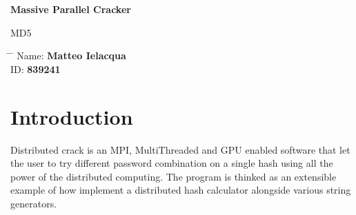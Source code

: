 \documentclass[12pt,a4paper]{article}
\title{}
\author{}
\date{}
\begin{document}
\newcommand{\subf}[2]{%
    {\small\begin{tabular}[t]{@{}c@{}}
                #1 \\#2
            \end{tabular}}%
}

\begin{titlepage}
    \begin{center}
        \vspace*{3cm}

        \Huge
        \textbf{Massive Parallel Cracker}

        \vspace{0.3cm}
        \Huge
        MD5

        \vspace{0.8cm}
        \large



        \vspace{0.5cm}
        \LARGE


        \vspace{1.5cm}

        \textbf{}

        \vfill



        \vspace{0.8cm}



        \Large




    \end{center}
    \Large
    \begin{tabbing}
        \hspace*{1em}\= \hspace*{8em} \= \kill %
        \> Name:\>  \textbf{Matteo Ielacqua} \\
        \> ID:\>  \textbf{839241} \\
    \end{tabbing}

\end{titlepage}


\section{Introduction}
Distributed crack is an MPI, MultiThreaded and GPU enabled software that let the user to try different password combination on a single hash using all the power of the distributed computing. The program is thinked as an extensible example of how implement a distributed hash calculator alongside various string generators.
\end{document}
